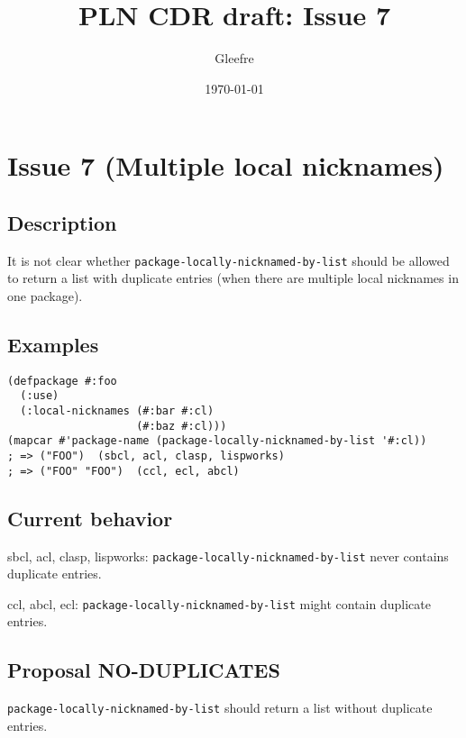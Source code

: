 \documentclass[11pt]{article}
\author{Gleefre}
\date{\today}
\title{PLN CDR draft: Issue 7}
\begin{document}
\maketitle

\section{Issue 7 (Multiple local nicknames)}
\label{sec:orgd71217b}
\subsection{Description}
\label{sec:org825ae38}
It is not clear whether \texttt{package-locally-nicknamed-by-list} should be allowed to return a
list with duplicate entries (when there are multiple local nicknames in one package).
\subsection{Examples}
\label{sec:org6b924c0}
\begin{verbatim}
(defpackage #:foo
  (:use)
  (:local-nicknames (#:bar #:cl)
                    (#:baz #:cl)))
(mapcar #'package-name (package-locally-nicknamed-by-list '#:cl))
; => ("FOO")  (sbcl, acl, clasp, lispworks)
; => ("FOO" "FOO")  (ccl, ecl, abcl)
\end{verbatim}
\subsection{Current behavior}
\label{sec:org0211e43}
sbcl, acl, clasp, lispworks:
  \texttt{package-locally-nicknamed-by-list} never contains duplicate entries.

ccl, abcl, ecl:
  \texttt{package-locally-nicknamed-by-list} might contain duplicate entries.
\subsection{Proposal NO-DUPLICATES}
\label{sec:org29460c7}
\texttt{package-locally-nicknamed-by-list} should return a list without duplicate entries.
\end{document}
